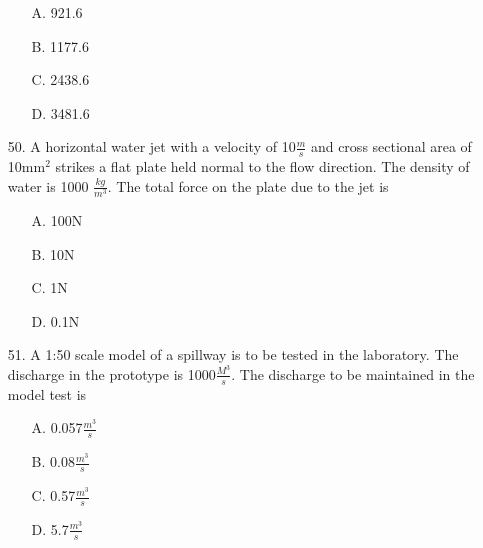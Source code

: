 \documentclass[journal]{IEEEtran}
\begin{document}
\begin{enumerate}
  \begin{enumerate}
    \item [A.] 921.6
    \item [B.] 1177.6
    \item [C.] 2438.6
    \item [D.] 3481.6
  \end{enumerate}
  \item [50.] A horizontal water jet with a velocity of 10$\frac{m}{s}$ and cross sectional area of 10mm$^2$
  strikes a flat plate held normal to the flow direction. The density of water is 1000
  $\frac{kg}{m^3}$. The total force on the plate due to the jet is 
  \begin{enumerate}
    \item [A.] 100N
    \item [B.] 10N 
    \item [C.] 1N 
    \item [D.] 0.1N 
  \end{enumerate}
  \item [51.] A 1:50 scale model of a spillway is to be tested in the laboratory. The discharge in
  the prototype is 1000$\frac{M^3}{s}$. The discharge to be maintained in the model test is 
  \begin{enumerate}
    \item [A.] 0.057$\frac{m^3}{s}$ 
    \item [B.] 0.08$\frac{m^3}{s}$
    \item [C.] 0.57$\frac{m^3}{s}$ 
    \item [D.] 5.7$\frac{m^3}{s}$
  \end{enumerate}
\end{enumerate}

\end{document}
